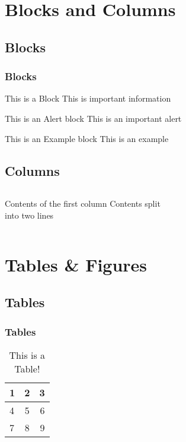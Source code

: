 \documentclass{beamer}
\begin{document}
	\section{Blocks and Columns}
		\subsection{Blocks}
			\begin{frame}
	 		\frametitle{Blocks}
			   \begin{block}{This is a Block}
			      This is important information
			   \end{block}
			 
			   \begin{alertblock}{This is an Alert block}
			   This is an important alert
			   \end{alertblock}

			   \begin{exampleblock}{This is an Example block}
			   This is an example 
			   \end{exampleblock}
			\end{frame}
		
		\subsection{Columns}
			\begin{frame}
		    \begin{columns}[c] %
		     Contents of the first column
		    \column{.5\textwidth}
		     Contents split \\ into two lines
		    \end{columns}
		\end{frame}
		 
		\begin{frame}

		\end{frame}
		
	\section{Tables \& Figures}
		\subsection{Tables}
		\begin{frame}
			\frametitle{Tables}
				 \begin{table}
				 	\begin{tabular}{ l | c || r | }
					    \hline
					    1 & 2 & 3 \\ \hline
					    4 & 5 & 6 \\ \hline
					    7 & 8 & 9 \\
					    \hline
					  \end{tabular}
				\caption{This is a Table!} 
				 \end{table}
		\end{frame}
\end{document}
